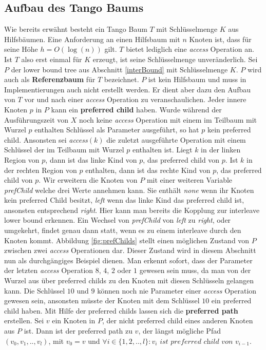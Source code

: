 \documentclass[a4paper,12pt]{article}
\begin{document}
\subsection{Aufbau des Tango Baums} \label{aufbauDesTango}
Wie bereits erwähnt besteht ein Tango Baum $T$ mit Schlüsselmenge $K$ aus Hilfsbäumen. Eine Anforderung an einen Hilfsbaum mit $n$ Knoten ist, dass für seine Höhe $h = O\left(\log\left( n\right)\right)$ gilt. $T$ bietet lediglich eine \textit{access} Operation an. Ist $T$ also erst einmal für $K$ erzeugt, ist seine Schlüsselmenge unveränderlich. Sei $P$ der lower bound tree aus Abschnitt \ref{interBound} mit Schlüsselmenge $K$. $P$ wird auch als \textbf{Referenzbaum} für $T$ bezeichnet. $P$ ist kein Hilfsbaum und muss in Implementierungen auch nicht erstellt werden. Er dient aber dazu den Aufbau von $T$ vor und nach einer \textit{access} Operation zu veranschaulichen. Jeder innere Knoten $p$ in $P$ kann ein \textbf{preferred child} haben.  Wurde während der Ausführungszeit von $X$ noch keine \textit{access} Operation mit einem im Teilbaum mit Wurzel $p$ enthalten Schlüssel als Parameter ausgeführt, so hat $p$ kein preferred child. Ansonsten sei \textit{access}$\left(k\right)$ die zuletzt ausgeführte Operation mit einem Schlüssel der im Teilbaum mit Wurzel $p$ enthalten ist. Liegt $k$ in der linken Region von $p$, dann ist das linke Kind von $p$, das preferred child von $p$. Ist $k$ in der rechten Region von $p$ enthalten, dann ist das rechte Kind von $p$, das preferred child von $p$. Wir erweitern die Knoten von $P$ mit einer weiteren Variable \textit{prefChild} welche drei Werte annehmen kann. Sie enthält \textit{none} wenn ihr Knoten kein preferred Child besitzt, \textit{left} wenn das linke Kind das preferred child ist, ansonsten entsprechend \textit{right}. Hier kann man bereits die Kopplung zur interleave lower bound erkennen. Ein Wechsel von \textit{prefChild}  von \textit{left} zu \textit{right}, oder umgekehrt, findet genau dann statt, wenn es zu einem interleave durch den Knoten kommt. Abbildung \ref{fig:prefChilds} stellt einen möglichen Zustand von $P$ zwischen zwei \textit{access} Operationen dar. Dieser Zustand wird in diesem Abschnitt nun als durchgängiges Beispiel dienen. Man erkennt sofort, dass der Parameter der letzten \textit{access} Operation $8$, $4$, $2$ oder $1$ gewesen sein muss, da man von der Wurzel aus über preferred childs zu den Knoten mit diesen Schlüsseln gelangen kann. Die Schlüssel $10$ und $9$ können noch nie Parameter einer \textit{access} Operation gewesen sein, ansonsten müsste der Knoten mit dem Schlüssel $10$ ein preferred child haben. Mit Hilfe der preferred childs lassen sich die \textbf{preferred path} erstellen. Sei $v$ ein Knoten in $P$, der nicht preferred child eines anderen Knoten aus $P$ ist. Dann ist der preferred path zu $v$, der längst mögliche Pfad $\left(v_0, v_1,..,v_l\right)$, mit $v_0 = v$ und $\forall i \in \{1,2,..,l\} \colon v_i \textit{ ist preferred child von }v_{i-1   }$.  
\end{document}
